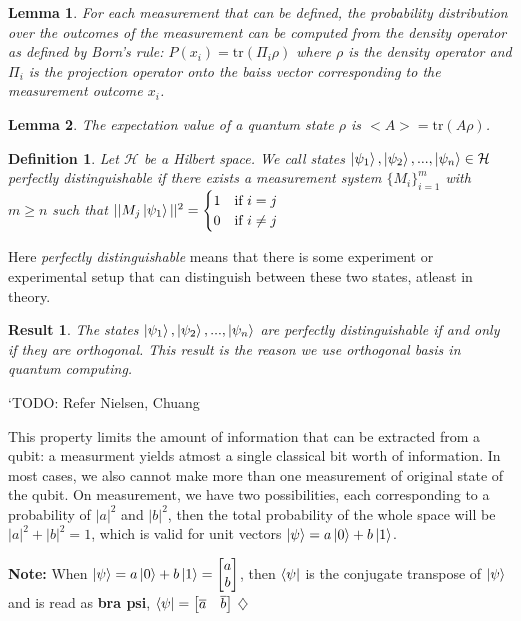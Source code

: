 \documentclass[12pt,twoside,fleqn]{report}
\theoremstyle{thmstyle}
\newtheorem{defn}{Definition}[chapter]
\newtheorem{lemma}{Lemma}[chapter]
\newtheorem{result}{Result}[chapter]
\newenvironment{note}{\textbf{Note:}}{\hfill\ensuremath{\diamondsuit}}
\begin{document}
\begin{lemma}
    For each measurement that can be defined, the probability distribution over the outcomes of the measurement can be computed from the density operator as defined by Born's rule:
    $P(x_i) = \text{tr}(\Pi_i \rho)$ where $\rho$ is the density operator and $\Pi_i$ is the projection operator onto the baiss vector corresponding to the measurement outcome $x_i$.
\end{lemma}

\begin{lemma}
    The expectation value of a quantum state $\rho$ is $<A> = \text{tr}(A \rho)$.
\end{lemma}

\begin{defn}
    Let $\mathcal{H}$ be a Hilbert space. We call states $\ket{\psi_1}, \ket{\psi_2}, ..., \ket{\psi_n} \in \mathcal{H}$ perfectly distinguishable if there exists a measurement system $\{ M_i \}_{i=1}^m$ with $m \geq n$ such that $|| M_j \ket{\psi_1} ||^2 = \begin{cases} 1 & \text{if } i = j \\ 0 & \text{if } i \neq j \end{cases}$
\end{defn}
Here \textit{perfectly distinguishable} means that there is some experiment or experimental setup that can distinguish between these two states, atleast in theory.
\begin{result}
    The states $\ket{\psi_1}, \ket{\psi_2}, ..., \ket{\psi_n}$ are perfectly distinguishable if and only if they are orthogonal. This result is the reason we use orthogonal basis in quantum computing.
\end{result}
`TODO: Refer Nielsen, Chuang

This property limits the amount of information that can be extracted from a qubit: a measurment yields atmost a single classical bit worth of information. In most cases, we also cannot make more than one measurement of original state of the qubit. On measurement, we have two possibilities, each corresponding to a probability of $|a|^2$ and $|b|^2$, then the total probability of the whole space will be $|a|^2 + |b|^2 = 1$, which is valid for unit vectors $\ket{\psi} = a \ket{0} + b \ket{1}$.

\begin{note}
    When $\ket{\psi} = a \ket{0} + b \ket{1} = \begin{bmatrix} a \\ b \end{bmatrix}$, then $\bra{\psi}$ is the conjugate transpose of $\ket{\psi}$ and is read as \textbf{bra psi}, $\bra{\psi} = \begin{bmatrix} \overline{a} & \overline{b}\end{bmatrix}$
\end{note}
\end{document}
